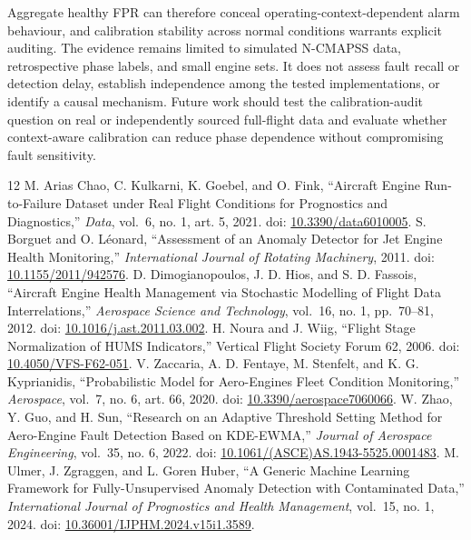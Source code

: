 \documentclass[10pt,twocolumn]{article}
\begin{document}
Aggregate healthy FPR can therefore conceal operating-context-dependent alarm behaviour, and calibration stability across normal conditions warrants explicit auditing. The evidence remains limited to simulated N-CMAPSS data, retrospective phase labels, and small engine sets. It does not assess fault recall or detection delay, establish independence among the tested implementations, or identify a causal mechanism. Future work should test the calibration-audit question on real or independently sourced full-flight data and evaluate whether context-aware calibration can reduce phase dependence without compromising fault sensitivity.
\begin{thebibliography}{12}
 M. Arias Chao, C. Kulkarni, K. Goebel, and O. Fink, ``Aircraft Engine Run-to-Failure Dataset under Real Flight Conditions for Prognostics and Diagnostics,'' \emph{Data}, vol.~6, no. 1, art. 5, 2021. doi: \href{https://doi.org/10.3390/data6010005}{10.3390/data6010005}.
 S. Borguet and O. Léonard, ``Assessment of an Anomaly Detector for Jet Engine Health Monitoring,'' \emph{International Journal of Rotating Machinery}, 2011. doi: \href{https://doi.org/10.1155/2011/942576}{10.1155/2011/942576}.
 D. Dimogianopoulos, J. D. Hios, and S. D. Fassois, ``Aircraft Engine Health Management via Stochastic Modelling of Flight Data Interrelations,'' \emph{Aerospace Science and Technology}, vol.~16, no. 1, pp.~70--81, 2012. doi: \href{https://doi.org/10.1016/j.ast.2011.03.002}{10.1016/j.ast.2011.03.002}.
 H. Noura and J. Wiig, ``Flight Stage Normalization of HUMS Indicators,'' Vertical Flight Society Forum 62, 2006. doi: \href{https://doi.org/10.4050/VFS-F62-051}{10.4050/VFS-F62-051}.
 V. Zaccaria, A. D. Fentaye, M. Stenfelt, and K. G. Kyprianidis, ``Probabilistic Model for Aero-Engines Fleet Condition Monitoring,'' \emph{Aerospace}, vol.~7, no. 6, art. 66, 2020. doi: \href{https://doi.org/10.3390/aerospace7060066}{10.3390/aerospace7060066}.
 W. Zhao, Y. Guo, and H. Sun, ``Research on an Adaptive Threshold Setting Method for Aero-Engine Fault Detection Based on KDE-EWMA,'' \emph{Journal of Aerospace Engineering}, vol.~35, no. 6, 2022. doi: \href{https://doi.org/10.1061/(ASCE)AS.1943-5525.0001483}{10.1061/(ASCE)AS.1943-5525.0001483}.
 M. Ulmer, J. Zgraggen, and L. Goren Huber, ``A Generic Machine Learning Framework for Fully-Unsupervised Anomaly Detection with Contaminated Data,'' \emph{International Journal of Prognostics and Health Management}, vol.~15, no. 1, 2024. doi: \href{https://doi.org/10.36001/IJPHM.2024.v15i1.3589}{10.36001/IJPHM.2024.v15i1.3589}.

\end{thebibliography}
\end{document}
